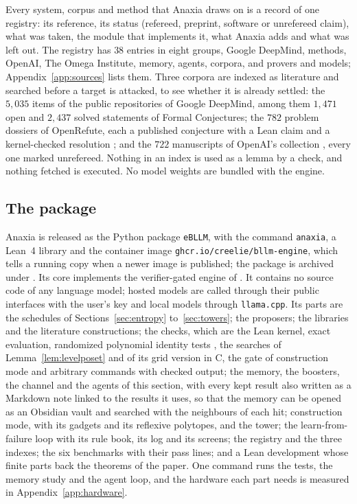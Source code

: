 Every system, corpus and method that Anaxia draws on is a record of one registry: its reference, its status (refereed, preprint, software or unrefereed claim), what was taken, the module that implements it, what Anaxia adds and what was left out. The registry has $38$ entries in eight groups, Google DeepMind, methods, OpenAI, The Omega Institute, memory, agents, corpora, and provers and models; Appendix~\ref{app:sources} lists them. Three corpora are indexed as literature and searched before a target is attacked, to see whether it is already settled: the $5{,}035$ items of the public repositories of Google DeepMind, among them $1{,}471$ open and $2{,}437$ solved statements of Formal Conjectures; the $782$ problem dossiers of OpenRefute, each a published conjecture with a Lean claim and a kernel-checked resolution \cite{OIT26}; and the $722$ manuscripts of OpenAI's collection \cite{OAI26b}, every one marked unrefereed. Nothing in an index is used as a lemma by a check, and nothing fetched is executed. No model weights are bundled with the engine.

\subsection{The package}\label{ssec:package}

Anaxia is released as the Python package \texttt{eBLLM}, with the command \texttt{anaxia}, a Lean~4 library and the container image \texttt{ghcr.io/creelie/bllm-engine}, which tells a running copy when a newer image is published; the package is archived under \anaxiaDOIlink \cite{Bha26c}. Its core implements the verifier-gated engine of \cite{Bha26a}. It contains no source code of any language model; hosted models are called through their public interfaces with the user's key and local models through \texttt{llama.cpp}. Its parts are the schedules of Sections~\ref{sec:entropy} to~\ref{sec:towers}; the proposers; the libraries and the literature constructions; the checks, which are the Lean kernel, exact evaluation, randomized polynomial identity tests \cite{Sch80,Zip79}, the searches of Lemma~\ref{lem:levelposet} and of its grid version in C, the gate of construction mode and arbitrary commands with checked output; the memory, the boosters, the channel and the agents of this section, with every kept result also written as a Markdown note linked to the results it uses, so that the memory can be opened as an Obsidian vault and searched with the neighbours of each hit; construction mode, with its gadgets and its reflexive polytopes, and the tower; the learn-from-failure loop with its rule book, its log and its screens; the registry and the three indexes; the six benchmarks with their pass lines; and a Lean development whose finite parts back the theorems of the paper. One command runs the tests, the memory study and the agent loop, and the hardware each part needs is measured in Appendix~\ref{app:hardware}.
